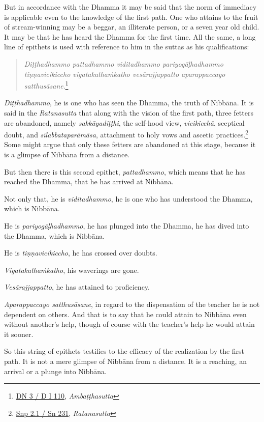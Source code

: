 But in accordance with the Dhamma it may be said that the norm of immediacy is applicable even to the knowledge of the first path. One who attains to the fruit of stream-winning may be a beggar, an illiterate person, or a seven year old child. It may be that he has heard the Dhamma for the first time. All the same, a long line of epithets is used with reference to him in the suttas as his qualifications:

\begin{quote}
\emph{Diṭṭhadhammo pattadhammo viditadhammo pariyogāḷhadhammo tiṇṇavicikiccho vigatakathaṁkatho vesārajjappatto aparappaccayo satthusāsane}.\footnote{\href{https://suttacentral.net/dn3/pli/ms}{DN 3 / D I 110}, \emph{Ambaṭṭhasutta}}
\end{quote}

\emph{Diṭṭhadhammo}, he is one who has seen the Dhamma, the truth of Nibbāna. It is said in the \emph{Ratanasutta} that along with the vision of the first path, three fetters are abandoned, namely \emph{sakkāyadiṭṭhi}, the self-hood view, \emph{vicikicchā}, sceptical doubt, and \emph{sīlabbataparāmāsa}, attachment to holy vows and ascetic practices.\footnote{\href{https://suttacentral.net/snp2.1/pli/ms}{Snp 2.1 / Sn 231}, \emph{Ratanasutta}} Some might argue that only these fetters are abandoned at this stage, because it is a glimpse of Nibbāna from a distance.

But then there is this second epithet, \emph{pattadhammo}, which means that he has reached the Dhamma, that he has arrived at Nibbāna.

Not only that, he is \emph{viditadhammo}, he is one who has understood the Dhamma, which is Nibbāna.

He is \emph{pariyogāḷhadhammo}, he has plunged into the Dhamma, he has dived into the Dhamma, which is Nibbāna.

He is \emph{tiṇṇavicikiccho}, he has crossed over doubts.

\emph{Vigatakathaṁkatho}, his waverings are gone.

\emph{Vesārajjappatto}, he has attained to proficiency.

\emph{Aparappaccayo satthusāsane}, in regard to the dispensation of the teacher he is not dependent on others. And that is to say that he could attain to Nibbāna even without another's help, though of course with the teacher's help he would attain it sooner.

So this string of epithets testifies to the efficacy of the realization by the first path. It is not a mere glimpse of Nibbāna from a distance. It is a reaching, an arrival or a plunge into Nibbāna.

